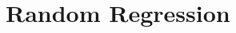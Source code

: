 \documentclass[twoside,leqno,twocolumn]{article}
\begin{document}
%

\section{Random Regression} 
%
\end{document}
